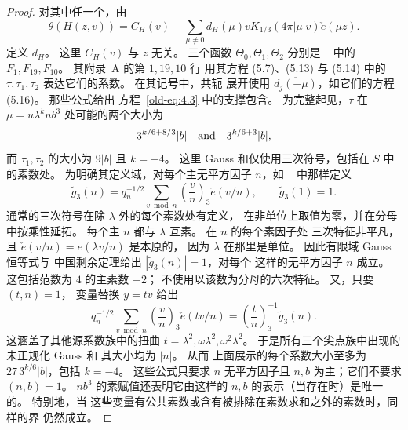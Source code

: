 \begin{proof}
对其中任一个，由
\begin{equation}\label{eq:reflection-cusp-expansion}
 \bar\theta(H(z,v))=C_H(v)+
 \sum_{\mu\ne0}d_H(\mu)vK_{1/3}(4\pi|\mu|v)\check e(\mu z).
\end{equation}
定义 $d_H$。 这里 $C_H(v)$ 与 $z$ 无关。
三个函数 $\Theta_0,\Theta_1,\Theta_2$ 分别是
~\cite{DR} 中的 $F_1,F_{19},F_{10}$。 其附录~A 的第 $1,19,10$ 行
用其方程 (5.7)、(5.13) 与 (5.14) 中的 $\tau,\tau_1,\tau_2$
表达它们的系数。 在其记号中，共轭
展开使用 $\overline{d_j(-\mu)}$，如它们的方程 (5.16)。
那些公式给出
方程~\eqref{old-eq:4.3} 中的支撑包含。 为完整起见，$\tau$ 在
$\mu=u\lambda^k n b^3$ 处可能的两个大小为
\[
 3^{k/6+8/3}|b|\quad\hbox{and}\quad3^{k/6+3}|b|,
\]
而 $\tau_1,\tau_2$ 的大小为 $9|b|$ 且 $k=-4$。
这里 Gauss 和仅使用三次符号，包括在 $S$ 中的素数处。
为明确其定义域，对每个主无平方因子 $n$，如
~\cite[方程 (1.7)]{DR} 中那样定义
\begin{equation}\label{eq:reflection-cubic-source-gauss}
 \widetilde g_3(n)=q_n^{-1/2}\sum_{v\bmod n}
       \left(\frac vn\right)_3\check e(v/n),
 \qquad \widetilde g_3(1)=1.
\end{equation}
通常的三次符号在除 $\lambda$ 外的每个素数处有定义，
在非单位上取值为零，并在分母中按乘性延拓。
每个主 $n$ 都与 $\lambda$ 互素。 在 $n$ 的每个素因子处
三次特征非平凡，且 $\check e(v/n)=e(\lambda v/n)$ 是本原的，
因为 $\lambda$ 在那里是单位。 因此有限域 Gauss 恒等式与
中国剩余定理给出 $|\widetilde g_3(n)|=1$，对每个
这样的无平方因子 $n$ 成立。 这包括范数为 $4$ 的主素数 $-2$；
不使用以该数为分母的六次特征。 又，只要 $(t,n)=1$，
变量替换 $y=tv$ 给出
\[
 q_n^{-1/2}\sum_{v\bmod n}\left(\frac vn\right)_3\check e(tv/n)
       =\left(\frac tn\right)_3^{-1}\widetilde g_3(n).
\]
这涵盖了其他源系数族中的扭曲 $t=\lambda^2,\omega\lambda^2,\omega^2\lambda^2$。
于是所有三个尖点族中出现的未正规化 Gauss 和
其大小均为 $|n|$。 从而
上面展示的每个系数大小至多为
$27\,3^{k/6}|b|$，包括 $k=-4$。 这些公式只要求
$n$ 无平方因子且 $n,b$ 为主；它们不要求
$(n,b)=1$。 $nb^3$ 的素赋值还表明它由这样的 $n,b$
的表示（当存在时）是唯一的。 特别地，当
这些变量有公共素数或含有被排除在素数求和之外的素数时，同样的界
仍然成立。


\end{proof}
